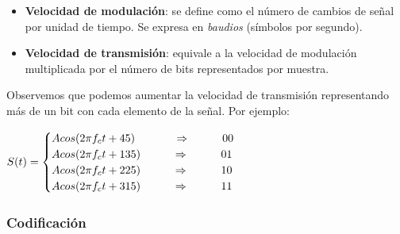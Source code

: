 \documentclass[]{article}
\begin{document}
\begin{itemize}
    \item \textbf{Velocidad de modulación}: se define como el número de cambios de señal por unidad de tiempo. Se expresa en \emph{baudios} (símbolos por segundo).
    \item \textbf{Velocidad de transmisión}: equivale a la velocidad de modulación multiplicada por el número de bits representados por muestra.
\end{itemize}

Observemos que podemos aumentar la velocidad de transmisión representando más de un bit con cada elemento de la señal. Por ejemplo:
\begin{center}
    $S(t) = \begin{cases}
        A cos(2 \pi f_c t + 45)\ \hspace{1.1cm}\Rightarrow\hspace{1cm}00\\
        A cos(2 \pi f_c t + 135)\hspace{1cm}\Rightarrow\hspace{1cm}01\\
        A cos(2 \pi f_c t + 225)\hspace{1cm}\Rightarrow\hspace{1cm}10\\
        A cos(2 \pi f_c t + 315)\hspace{1cm}\Rightarrow\hspace{1cm}11
    \end{cases}$
\end{center}

\subsubsection{Codificación}


\end{document}
